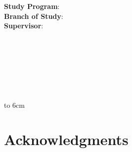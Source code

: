 \ifx\draft\undefined
\thispagestyle{empty}
\begin{center}
  \Large \sc \mfuniversity \\
  \mffaculty 
\end{center}
\vspace{7cm}
\begin{center}
  {\Huge \mftitle}\\
  \large \mfthesistype
\end{center}
\vspace{7cm}

\noindent
{\bf Study Program}: \mfstudyprogram\\
{\bf Branch of Study}: \mfbranchofstudy\\
{\bf Supervisor}: \mfadvisor

\vfill
\noindent
\mfplacedate \hfill {\large \mfauthor}\\




\ifx\draft\undefined
\chapter*{}

{~}\vspace{10cm}

\begin{minipage}{0.25\textwidth}~\end{minipage}
\begin{minipage}{0.69\textwidth}
\mfdeclaration

\bigskip\bigskip

\hfill\hbox to 6cm{\dotfill}
\end{minipage}
\vfill %
\fi


\ifx\draft\undefined
\chapter*{Acknowledgments} 

